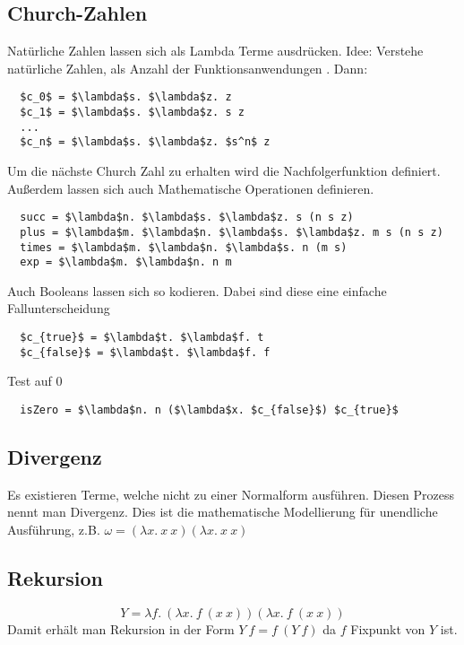 \subsection{Church-Zahlen}%
\label{tg:sub:church-zahlen}
Natürliche Zahlen lassen sich als Lambda Terme ausdrücken.
Idee: Verstehe natürliche Zahlen, als Anzahl der Funktionsanwendungen . Dann:
\begin{lstlisting}
  $c_0$ = $\lambda$s. $\lambda$z. z
  $c_1$ = $\lambda$s. $\lambda$z. s z
  ...
  $c_n$ = $\lambda$s. $\lambda$z. $s^n$ z

\end{lstlisting}
Um die nächste Church Zahl zu erhalten wird die Nachfolgerfunktion  definiert.
Außerdem lassen sich auch Mathematische Operationen definieren.
\begin{lstlisting}
  succ = $\lambda$n. $\lambda$s. $\lambda$z. s (n s z)
  plus = $\lambda$m. $\lambda$n. $\lambda$s. $\lambda$z. m s (n s z)
  times = $\lambda$m. $\lambda$n. $\lambda$s. n (m s)
  exp = $\lambda$m. $\lambda$n. n m
\end{lstlisting}
Auch Booleans lassen sich so kodieren. Dabei sind diese eine einfache Fallunterscheidung
\begin{lstlisting}
  $c_{true}$ = $\lambda$t. $\lambda$f. t
  $c_{false}$ = $\lambda$t. $\lambda$f. f
\end{lstlisting}
Test auf 0
\begin{lstlisting}
  isZero = $\lambda$n. n ($\lambda$x. $c_{false}$) $c_{true}$
\end{lstlisting}

\subsection{Divergenz}%
\label{tg:sub:divergenz}
Es existieren Terme, welche nicht zu einer Normalform ausführen. Diesen Prozess nennt man Divergenz.
Dies ist die mathematische Modellierung für unendliche Ausführung, z.B.
\(\omega = (\lambda x.\ x\ x)(\lambda x.\ x\ x)\)

\subsection{Rekursion}%
\label{tg:sub:rekursion}
\[Y = \lambda f.\ (\lambda x.\ f\ (x\ x))(\lambda x.\ f\ (x\ x))\]
Damit erhält man Rekursion in der Form \(Y\ f = f\ (Y\ f)\) da \(f\) Fixpunkt von \(Y\) ist.


